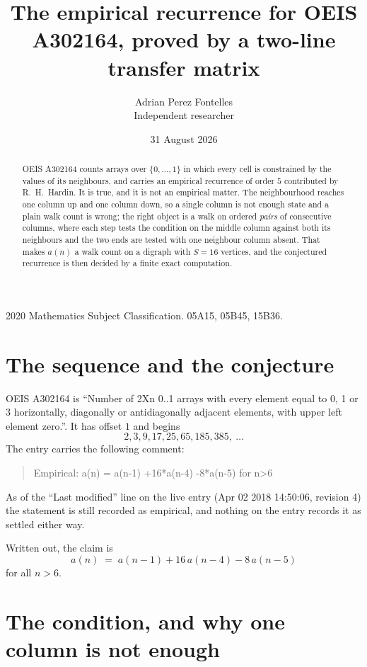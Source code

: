 \documentclass[11pt,a4paper]{article}
\title{The empirical recurrence for OEIS A302164, proved by a two-line transfer matrix}
\author{Adrian Perez Fontelles\\ \small Independent researcher}
\date{31 August 2026}
\theoremstyle{plain}
\theoremstyle{definition}
\begin{document}
\maketitle

\begin{abstract}
OEIS A302164 counts arrays over $\{0,\dots,1\}$ in which every cell is constrained by the
values of its neighbours, and carries an empirical recurrence of order $5$ contributed
by R.~H.~Hardin. It is true, and it is not an empirical matter. The neighbourhood reaches one
column up and one column down, so a single column is not enough state and a plain walk count
is wrong; the right object is a walk on ordered \emph{pairs} of consecutive columns, where
each step tests the condition on the middle column against both its neighbours and the two
ends are tested with one neighbour column absent. That makes $a(n)$ a walk count on a digraph
with $S=16$ vertices, and the conjectured recurrence is then decided by a finite exact
computation.
\end{abstract}

\noindent\small 2020 Mathematics Subject Classification. 05A15, 05B45, 15B36.\normalsize

\section{The sequence and the conjecture}

OEIS A302164 is ``Number of 2Xn 0..1 arrays with every element equal to 0, 1 or 3 horizontally, diagonally or antidiagonally adjacent elements, with upper left element zero.''. It has offset $1$ and begins
\[
2, 3, 9, 17, 25, 65, 185, 385,\ \dots
\]
The entry carries the following comment:
\begin{quote}\small
Empirical: a(n) = a(n-1) +16*a(n-4) -8*a(n-5) for n>6
\end{quote}
As of the ``Last modified'' line on the live entry (Apr 02 2018 14:50:06, revision 4) the statement is
still recorded as empirical, and nothing on the entry records it as settled either way.

Written out, the claim is
\begin{equation}\label{eq:conj}
a(n)\;=\;a(n-1) + 16\,a(n-4) - 8\,a(n-5)
\end{equation}
for all $n>6$.

\section{The condition, and why one column is not enough}
\end{document}
